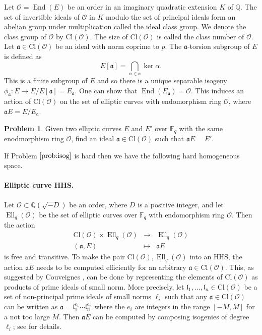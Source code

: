 \documentclass[11pt]{article}
\theoremstyle{plain}
\theoremstyle{definition}
\newtheorem*{problem}{Problem}
\DeclareMathOperator{\groupofend}{End} %
\DeclareMathOperator{\elli}{Ell}
\def\Q{\mathbb{Q}}
\def\F{\mathbb{F}}
\renewcommand{\O}{\mathcal{O}}
\newcommand{\clo}{\text{Cl}(\mathcal{O})}
\begin{document}
Let $\O = \groupofend(E)$ be an order in an imaginary quadratic extension $K$ of $\Q$. The set of 
invertible ideals of $\O$ in $K$ modulo the set of principal ideals form an abelian group under 
multiplication called the ideal class group. We denote the class group of $\O$ by $\clo$. The size 
of $\clo$ is called the class number of $\O$. Let $\mathfrak{a} \in \clo$ be an ideal with norm 
coprime to $p$. The $\mathfrak{a}$-torsion subgroup of $E$ is defined as
\[ E[\mathfrak{a}] = \bigcap_{\alpha \in \mathfrak{a}} \ker \alpha. \]
This is a finite subgroup of $E$ and so there is a unique separable isogeny $\phi_{\mathfrak{a}}: E 
\rightarrow E / E[\mathfrak{a}] = E_{\mathfrak{a}}$. One can show that $\groupofend(E_{\mathfrak{a}}) 
= \O$. This induces an action of $\clo$ on the set of elliptic curves with endomorphism ring $\O$, 
where $\mathfrak{a} E = E / E_{\mathfrak{a}}$.
\begin{problem}
\label{prob:isog}
	Given two elliptic curves $E$ and $E'$ over $\F_q$ with the same enodmorphism ring $\O$, find an 
	ideal $\mathfrak{a} \in \clo$ such that $\mathfrak{a} E = E'$.
\end{problem}
If Problem $\ref{prob:isog}$ is hard then we have the following hard homogeneous space.

\paragraph{Elliptic curve HHS.}
Let $\O \subset \Q(\sqrt{-D})$ be an order, where $D$ is a positive integer, and let $\elli_q(\O)$ 
be the set of elliptic curves over $\F_q$ with endomorphism ring $\O$. Then the action
\[
\begin{array}{rll}
	\clo \times \elli_q(\O) & \longrightarrow & \elli_q(\O) \\
	(\mathfrak{a}, E) & \longmapsto & \mathfrak{a} E
\end{array}
\]
is free and transitive. To make the pair $\clo, \elli_q(\O)$ into an HHS, the action $\mathfrak{a} 
E$ needs to be computed efficiently for an arbitrary $\mathfrak{a} \in \clo$. This, as suggested by 
Couveignes \cite{couveignes2006hard}, can be done by representing the elements of $\clo$ as products 
of prime ideals of small norm. More precisely, let $\mathfrak{l}_1, \dots, \mathfrak{l}_n \in \clo$ 
be a set of non-principal prime ideals of small norms $\ell_i$ such that any $\mathfrak{a} \in \clo$ 
can be written as $\mathfrak{a} = \mathfrak{l}_1^{e_1} \cdots \mathfrak{l}_n^{e_n}$ where the $e_i$ 
are integers in the range $[-M, M]$ for a not too large $M$. Then $\mathfrak{a} E$ can be computed 
by composing isogenies of degree $\ell_i$; see \cite{de2018towards} for details.
\end{document}
